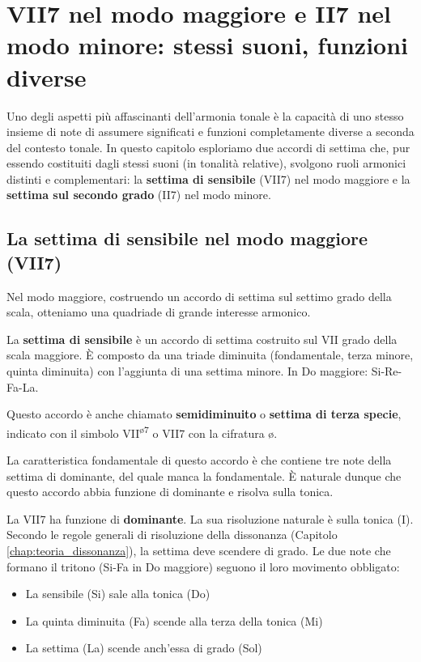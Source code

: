\chapter{VII7 nel modo maggiore e II7 nel modo minore: stessi suoni, funzioni diverse}
\label{chap:vii7_ii7}

Uno degli aspetti più affascinanti dell'armonia tonale è la capacità di uno stesso insieme di note di assumere significati e funzioni completamente diverse a seconda del contesto tonale. In questo capitolo esploriamo due accordi di settima che, pur essendo costituiti dagli stessi suoni (in tonalità relative), svolgono ruoli armonici distinti e complementari: la \textbf{settima di sensibile} (VII7) nel modo maggiore e la \textbf{settima sul secondo grado} (II7) nel modo minore.

\section{La settima di sensibile nel modo maggiore (VII7)}
\label{sec:vii7_maggiore}

Nel modo maggiore, costruendo un accordo di settima sul settimo grado della scala, otteniamo una quadriade di grande interesse armonico.

\begin{definizione}
	\label{def:vii7}
	La \textbf{settima di sensibile} è un accordo di settima costruito sul VII grado della scala maggiore. È composto da una triade diminuita (fondamentale, terza minore, quinta diminuita) con l'aggiunta di una settima minore. In Do maggiore: Si-Re-Fa-La.
	
	Questo accordo è anche chiamato \textbf{semidiminuito} o \textbf{settima di terza specie}, indicato con il simbolo VII\textsuperscript{\o 7} o VII7 con la cifratura {\o}.
\end{definizione}

La caratteristica fondamentale di questo accordo è che contiene tre note della settima di dominante, del quale manca la fondamentale. È naturale dunque che questo accordo abbia funzione di dominante e risolva sulla tonica.

\begin{regola}
	\label{reg:funzione_vii7}
	La VII7 ha funzione di \textbf{dominante}. La sua risoluzione naturale è sulla tonica (I). Secondo le regole generali di risoluzione della dissonanza (Capitolo \ref{chap:teoria_dissonanza}), la settima deve scendere di grado. Le due note che formano il tritono (Si-Fa in Do maggiore) seguono il loro movimento obbligato:
	\begin{itemize}
		\item La sensibile (Si) sale alla tonica (Do)
		\item La quinta diminuita (Fa) scende alla terza della tonica (Mi)
		\item La settima (La) scende anch'essa di grado (Sol)
	\end{itemize}
\end{regola}


